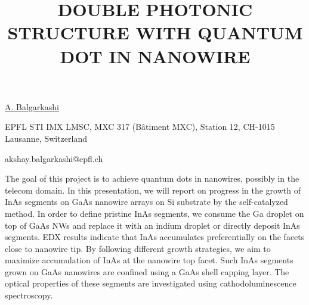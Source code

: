 \title{DOUBLE PHOTONIC STRUCTURE WITH QUANTUM DOT IN NANOWIRE}

\underline{A. Balgarkashi}  

{\normalsize{\vspace{-4mm}
EPFL STI IMX LMSC,
MXC 317 (Bâtiment MXC),
Station 12,
CH-1015 Lausanne,
Switzerland



\email akshay.balgarkashi@epfl.ch}}

The goal of this project is to achieve quantum dots in nanowires, possibly in the telecom domain. In this presentation, we will report on progress in the growth of InAs segments on GaAs nanowire arrays on Si substrate by the self-catalyzed method. In order to define pristine InAs segments, we consume the Ga droplet on top of GaAs NWs and replace it with an indium droplet or directly deposit InAs segments. EDX results indicate that InAs accumulates preferentially on the facets close to nanowire tip. By following different growth strategies, we aim to maximize accumulation of InAs at the nanowire top facet. Such InAs segments grown on GaAs nanowires are confined using a GaAs shell capping layer. The optical properties of these segments are investigated using cathodoluminescence spectroscopy.

\vspace{\baselineskip}
